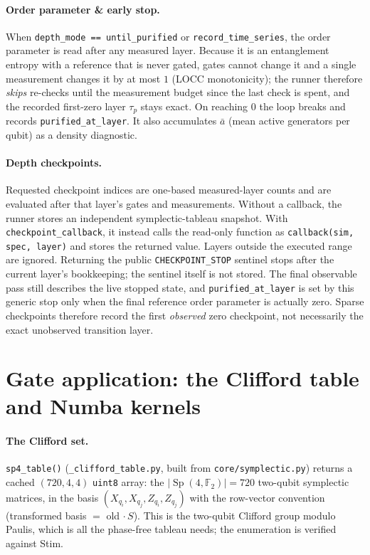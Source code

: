 \documentclass[11pt]{article}
\newcommand{\F}{\mathbb{F}}
\newcommand{\Sp}{\operatorname{Sp}}
\newcommand{\code}[1]{\texttt{#1}}
\newcommand{\file}[1]{\texttt{#1}}
\begin{document}
\paragraph{Order parameter \& early stop.} When \code{depth\_mode == until\_purified} or
\code{record\_time\_series}, the order parameter is read after any measured layer. Because it is an entanglement
entropy with a reference that is never gated, gates cannot change it and a single measurement changes it by at
most $1$ (LOCC monotonicity); the runner therefore \emph{skips} re-checks until the measurement budget since the
last check is spent, and the recorded first-zero layer $\tau_p$ stays exact. On reaching $0$ the loop breaks and
records \code{purified\_at\_layer}. It also accumulates $\bar a$ (mean active generators per qubit) as a density
diagnostic.

\paragraph{Depth checkpoints.} Requested checkpoint indices are one-based measured-layer counts and are evaluated
after that layer's gates and measurements. Without a callback, the runner stores an independent symplectic-tableau
snapshot. With \code{checkpoint\_callback}, it instead calls the read-only function as
\code{callback(sim, spec, layer)} and stores the returned value. Layers outside the executed range are ignored.
Returning the public \code{CHECKPOINT\_STOP} sentinel stops after the current layer's bookkeeping; the sentinel
itself is not stored. The final observable pass still describes the live stopped state, and
\code{purified\_at\_layer} is set by this generic stop only when the final reference order parameter is actually
zero. Sparse checkpoints therefore record the first \emph{observed} zero checkpoint, not necessarily the exact
unobserved transition layer.

\section{Gate application: the Clifford table and Numba kernels}
\label{sec:gates}
\paragraph{The Clifford set.} \code{sp4\_table()} (\file{\_clifford\_table.py}, built from
\file{core/symplectic.py}) returns a cached $(720,4,4)$ \code{uint8} array: the $|\!\Sp(4,\F_2)|=720$ two-qubit
symplectic matrices, in the basis $(X_{q_i},X_{q_j},Z_{q_i},Z_{q_j})$ with the row-vector convention
(transformed basis $=$ old $\cdot\,S$). This is the two-qubit Clifford group modulo Paulis, which is all the
phase-free tableau needs; the enumeration is verified against Stim.
\end{document}

